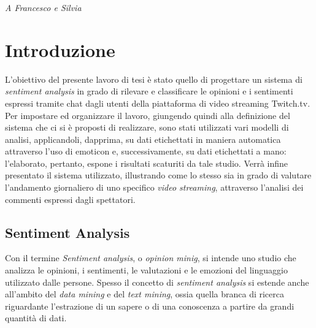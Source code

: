 \documentclass[a4paper,12pt,openright,twoside]{report}
\makeatletter
\theoremstyle{definition}
\def\cleardoublepage{\clearpage\if@twoside \ifodd\c@page\else
\hbox{}
\vspace*{\fill}
\begin{center}
\textit{}
\end{center}
\vspace{\fill}
\thispagestyle{empty}
\newpage
\if@twocolumn\hbox{}\newpage\fi\fi\fi}
\makeatother
\begin{document}


\begin{titlepage} 
\begin{flushright}
\null{}
{\Large \emph{A Francesco e Silvia}}
\null
\end{flushright}
\clearpage{\pagestyle{empty}\cleardoublepage}
\end{titlepage}
\chapter*{Introduzione}                 %
{}

L'obiettivo del presente lavoro di tesi è stato quello di progettare un sistema di \emph{sentiment analysis} in 
grado di rilevare e classificare le opinioni e i sentimenti espressi tramite chat dagli 
utenti della piattaforma di video streaming Twitch.tv. 
Per impostare ed organizzare il lavoro, giungendo quindi alla definizione del sistema che ci si è 
proposti di realizzare, sono stati utilizzati vari modelli di analisi, 
applicandoli, dapprima, su dati etichettati in maniera automatica attraverso 
l'uso di emoticon e, successivamente, su dati etichettati a mano: 
l'elaborato, pertanto, espone i risultati scaturiti da tale studio.
Verrà infine presentato il sistema utilizzato, illustrando come lo stesso sia 
in grado di valutare l’andamento giornaliero di uno specifico \emph{video streaming}, attraverso 
l’analisi dei commenti espressi dagli spettatori.

\section*{Sentiment Analysis}
\label{sec:sentAnal}
Con il termine \emph{Sentiment analysis}, o \emph{opinion minig}, si intende uno studio 
che analizza le opinioni, i sentimenti, le valutazioni e le
emozioni del linguaggio utilizzato dalle persone.
Spesso il concetto di \emph{sentiment analysis} si estende anche all'ambito del \emph{data mining} e
del \emph{text mining}, ossia quella branca di ricerca riguardante l'estrazione di un sapere o 
di una conoscenza a partire da grandi quantità di dati.
\end{document}
